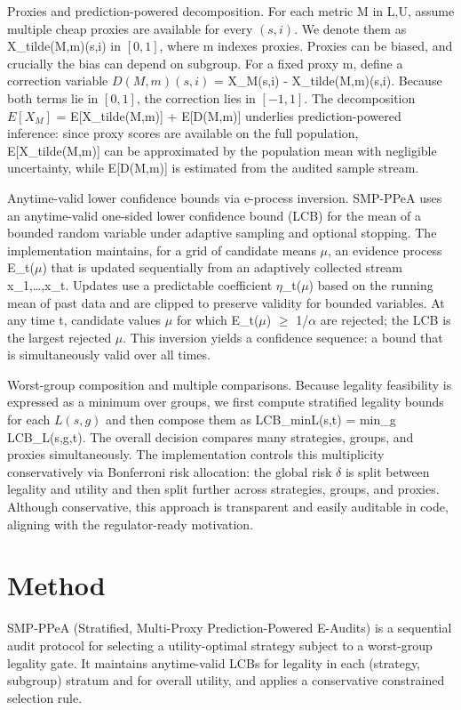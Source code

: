 \documentclass{article} %
\begin{document}
Proxies and prediction-powered decomposition. For each metric M in {L,U}, assume multiple cheap proxies are available for every $(s,i)$. We denote them as X_tilde(M,m)(s,i) in $[0,1]$, where m indexes proxies. Proxies can be biased, and crucially the bias can depend on subgroup. For a fixed proxy m, define a correction variable $D(M,m)(s,i)$ = X_M(s,i) - X_tilde(M,m)(s,i). Because both terms lie in $[0,1]$, the correction lies in $[-1,1]$. The decomposition $E[X_M]$ = E[X_tilde(M,m)] + E[D(M,m)] underlies prediction-powered inference: since proxy scores are available on the full population, E[X_tilde(M,m)] can be approximated by the population mean with negligible uncertainty, while E[D(M,m)] is estimated from the audited sample stream.

Anytime-valid lower confidence bounds via e-process inversion. SMP-PPeA uses an anytime-valid one-sided lower confidence bound (LCB) for the mean of a bounded random variable under adaptive sampling and optional stopping. The implementation maintains, for a grid of candidate means \ensuremath{\mu}, an evidence process E_t(\ensuremath{\mu}) that is updated sequentially from an adaptively collected stream x_1,\ldots{},x_t. Updates use a predictable coefficient \ensuremath{\eta}_t(\ensuremath{\mu}) based on the running mean of past data and are clipped to preserve validity for bounded variables. At any time t, candidate values \ensuremath{\mu} for which E_t(\ensuremath{\mu}) \ensuremath{\geq} 1/\ensuremath{\alpha} are rejected; the LCB is the largest rejected \ensuremath{\mu}. This inversion yields a confidence sequence: a bound that is simultaneously valid over all times.

Worst-group composition and multiple comparisons. Because legality feasibility is expressed as a minimum over groups, we first compute stratified legality bounds for each $L(s,g)$ and then compose them as LCB_minL(s,t) = min_g LCB_L(s,g,t). The overall decision compares many strategies, groups, and proxies simultaneously. The implementation controls this multiplicity conservatively via Bonferroni risk allocation: the global risk \ensuremath{\delta} is split between legality and utility and then split further across strategies, groups, and proxies. Although conservative, this approach is transparent and easily auditable in code, aligning with the regulator-ready motivation.

\section{Method}
\label{sec:method}
SMP-PPeA (Stratified, Multi-Proxy Prediction-Powered E-Audits) is a sequential audit protocol for selecting a utility-optimal strategy subject to a worst-group legality gate. It maintains anytime-valid LCBs for legality in each (strategy, subgroup) stratum and for overall utility, and applies a conservative constrained selection rule.
\end{document}
